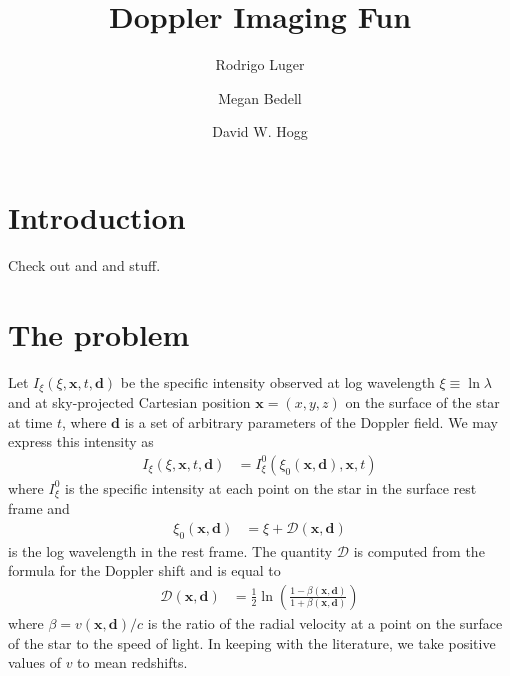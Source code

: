 \documentclass[modern]{aastex62}
\begin{document}
\title{Doppler Imaging Fun}

\author[0000-0002-0296-3826]{Rodrigo Luger}
%
\author{Megan Bedell}
%
\author{David W. Hogg}

%
\section{Introduction}
%
Check out \citet{Luger2019} and \citet{Bedell2019} and stuff.

%
\section{The problem}
\label{sec:the_problem}
%
Let $I_\xi(\xi, \mathbf{x}, t, \mathbf{d})$ be the specific 
intensity observed 
at log wavelength $\xi \equiv \ln\lambda$ and at sky-projected 
Cartesian position $\mathbf{x} = (x, y, z)$ on the surface of the 
star at time $t$, where
$\mathbf{d}$ is a set of arbitrary parameters of the Doppler field.
We may express this intensity as
%
\begin{align}
    \label{eq:intro:Ixi}
    I_\xi(\xi, \mathbf{x}, t, \mathbf{d}) &= 
        I_{\xi}^0(\xi_0(\mathbf{x}, \mathbf{d}), \mathbf{x}, t)
\end{align}
%
where $I_{\xi}^0$ is the specific intensity at each point on the star 
in the surface rest frame and 
%
\begin{align}
    \label{eq:intro:xi0}
    \xi_0(\mathbf{x}, \mathbf{d}) &= \xi + \mathcal{D}(\mathbf{x}, \mathbf{d})
\end{align}
%
is the log wavelength in the rest frame. The quantity $\mathcal{D}$ is
computed from the formula for the Doppler shift and is equal to
%
\begin{align}
    \label{eq:intro:D}
    \mathcal{D}(\mathbf{x}, \mathbf{d}) 
        &=
        \frac{1}{2}\ln\left( 
            \frac{1 - \beta(\mathbf{x}, \mathbf{d})}{1 + \beta(\mathbf{x}, \mathbf{d})} 
        \right)
\end{align}
%
where $\beta = v(\mathbf{x}, \mathbf{d}) / c$ is the ratio of the 
radial velocity at a point on the surface of the star to the speed of light.
In keeping with the literature, we take positive values of $v$ to mean 
redshifts.
\end{document}
